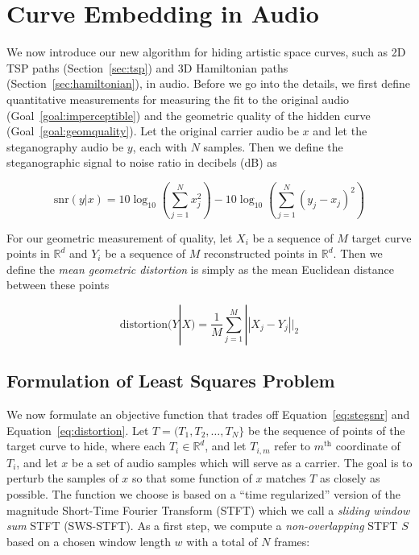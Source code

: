 \documentclass[runningheads]{llncs}
\begin{document}
\section{Curve Embedding in Audio}
\label{sec:methods}

We now introduce our new algorithm for hiding artistic space curves, such as 2D TSP paths (Section~\ref{sec:tsp}) and 3D Hamiltonian paths (Section~\ref{sec:hamiltonian}), in audio.  Before we go into the details, we first define quantitative measurements for measuring the fit to the original audio (Goal~\ref{goal:imperceptible}) and the geometric quality of the hidden curve (Goal~\ref{goal:geomquality}).  Let the original carrier audio be $x$ and let the steganography audio be $y$, each with $N$ samples.  Then we define the steganographic signal to noise ratio in decibels (dB) as 

\begin{equation}
  \label{eq:stegsnr}
   \text{snr}(y|x) = 10  \log_{10} \left(\sum_{j=1}^N x_j^2 \right) -  10 \log_{10}\left(\sum_{j=1}^N (y_j-x_j)^2  \right)
\end{equation}

For our geometric measurement of quality, let $X_i$ be a sequence of $M$ target curve points in $\mathbb{R}^d$ and $Y_i$ be a sequence of $M$ reconstructed points in $\mathbb{R}^d$.  Then we define the {\em mean geometric distortion} is simply as the mean Euclidean distance between these points 

\begin{equation}
  \label{eq:distortion}
  \text{distortion}(Y|X) = \frac{1}{M} \sum_{j=1}^M ||X_j - Y_j||_2
\end{equation}


\subsection{Formulation of Least Squares Problem}
\label{sec:formulation}

We now formulate an objective function that trades off Equation~\ref{eq:stegsnr} and Equation~\ref{eq:distortion}.  Let $T = (T_1, T_2, \hdots, T_N \}$ be the sequence of points of the target curve to hide, where each $T_i \in \mathbb{R}^d$, and let $T_{i, m}$ refer to $m^{\text{th}}$ coordinate of $T_i$, and let $x$ be a set of audio samples which will serve as a carrier.  The goal is to perturb the samples of $x$ so that some function of $x$ matches $T$ as closely as possible.  The function we choose is based on a ``time regularized'' version of the magnitude Short-Time Fourier Transform (STFT) which we call a {\em sliding window sum} STFT (SWS-STFT).  As a first step, we compute a {\em non-overlapping} STFT $S$ based on a chosen window length $w$ with a total of $N$ frames:
\end{document}

